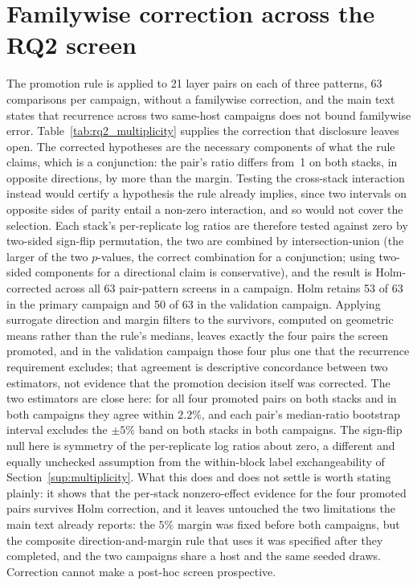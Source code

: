 \documentclass[11pt,a4paper]{article}
\begin{document}
\section{Familywise correction across the RQ2 screen}
\label{sup:rq2-multiplicity}
The promotion rule is applied to 21 layer pairs on each of three patterns, 63 comparisons per
campaign, without a familywise correction, and the main text states that recurrence across two
same-host campaigns does not bound familywise error. Table~\ref{tab:rq2_multiplicity} supplies the
correction that disclosure leaves open. The corrected hypotheses are the necessary
components of what the rule claims, which is a conjunction: the pair's ratio differs from~1 on both stacks, in opposite
directions, by more than the margin. Testing the cross-stack interaction instead would certify a
hypothesis the rule already implies, since two intervals on opposite sides of parity entail a
non-zero interaction, and so would not cover the selection. Each stack's per-replicate log ratios are
therefore tested against zero by two-sided sign-flip permutation, the two are combined by
intersection-union (the larger of the two $p$-values, the correct combination for a conjunction;
using two-sided components for a directional claim is conservative), and
the result is Holm-corrected across all 63 pair-pattern screens in a campaign. Holm retains 53 of 63 in the primary campaign
and 50 of 63 in the validation campaign. Applying surrogate direction and margin filters to the
survivors, computed on geometric means rather than the rule's medians, leaves exactly the four
pairs the screen promoted, and in the validation campaign those four plus one that the recurrence
requirement excludes; that agreement is descriptive concordance between two estimators, not
evidence that the promotion decision itself was corrected. The two estimators are close here: for
all four promoted pairs on both stacks and in both campaigns they agree within $2.2\%$, and each
pair's median-ratio bootstrap interval excludes the $\pm5\%$ band on both stacks in both
campaigns. The sign-flip null here is
symmetry of the per-replicate log ratios about zero, a different and equally unchecked assumption
from the within-block label exchangeability of Section~\ref{sup:multiplicity}. What this does and
does not settle is worth stating plainly: it shows that the per-stack nonzero-effect evidence for the four promoted pairs survives Holm
correction,
and it leaves untouched the two limitations the main text already reports: the $5\%$ margin was
fixed before both campaigns, but the composite direction-and-margin rule that uses it was specified
after they completed, and the two campaigns share a host and the same seeded draws. Correction cannot make a post-hoc screen prospective.
\end{document}
